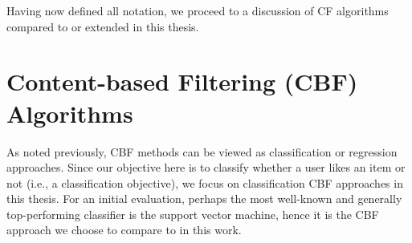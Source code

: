 %
%

Having now defined all notation, we proceed to a discussion of
CF algorithms compared to or extended in this thesis.

\section{Content-based Filtering (CBF) Algorithms}

As noted previously, CBF methods can be viewed as classification
or regression approaches.  Since our objective here is to classify
whether a user likes an item or not (i.e., a classification objective),
we focus on classification CBF approaches in this thesis.  For
an initial evaluation, perhaps the most well-known and generally
top-performing classifier is the support vector machine, hence it is
the CBF approach we choose to compare to in this work.

